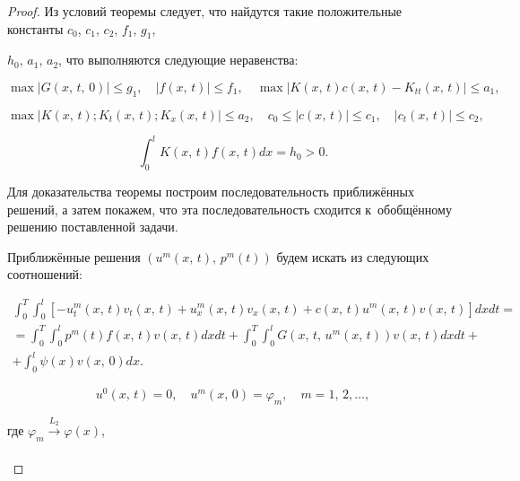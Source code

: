  \begin{proof}  Из условий теоремы следует, что найдутся такие положительные константы $c_0$, $ c_1$, $ c_2$, $ f_1$, $ g_1$,

 $h_0$, $ a_1$, $ a_2$, что выполняются следующие неравенства:

$$\max\left|G(x,\,t,\,0)\right|\leq g_1, \quad  \left|f(x,\,t)\right|\leq f_1, \quad \max\left| K(x,\,t)c(x,\,t)-K_{tt}(x,\,t)\right|\leq a_1,$$

$$\max\left| K(x,\,t); K_t(x,\,t); K_x(x,\,t) \right|\leq a_2,\quad c_0\leq \left|c(x,\,t)\right|\leq c_1,\quad   \left|c_t(x,\,t)\right|\leq  c_2,$$ 

$$ \int _0^l K(x,\,t) f(x,\,t) dx=h_0>0.$$



Для доказательства теоремы построим последовательность приближённых решений, а затем покажем, что эта последовательность сходится к~обобщённому решению поставленной задачи.



Приближённые решения $(u^m(x,\,t),\,p^m(t))$ будем искать из следующих соотношений:

     \begin{multline}

     \label{nvb:eq7}

    \int _0^T \int _0^l \left[ - u_t^m(x,\,t)v_t(x,\,t)+u_x^m(x,\,t)v_x(x,\,t) + c(x,\,t)u^m(x,\,t)v(x,\,t)\right]

    dxdt=\\

    =\int _0^T\int _0^l p^m(t)f(x,\,t)v(x,\,t)dxdt+\int _0^T\int _0^l G(x,\,t,\,u^m(x,\,t)) v(x,\,t)dxdt +\\

    +\int _0^l \psi(x)v(x,\,0)dx.

    \end{multline}

    \begin{equation}

    \label{nvb:eq8}

    u^0(x,\,t)=0, \quad  u^m(x,\,0)=\varphi_m, \quad m=1,\,2, \ldots,

    \end{equation}

где  $\varphi_m \xrightarrow{L_2}{\varphi(x)}$,

    \begin{multline}

    \label{nvb:eq9}


\end{multline}
\end{proof}
